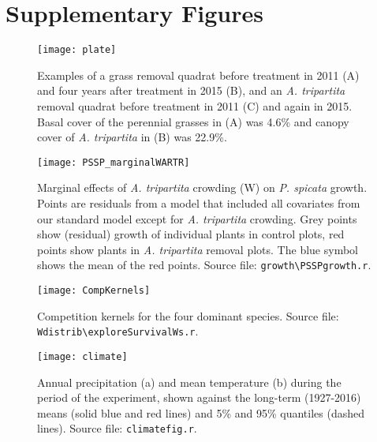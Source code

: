 \documentclass[11pt]{article}
\begin{document}
\section{Supplementary Figures} 

 \begin{figure}[h]
 \centering
 \texttt{[image: plate]}
 \caption{Examples of a grass removal quadrat before treatment in 2011 (A) and four years after treatment in 2015 (B), and an \textit{A. tripartita} removal quadrat before treatment in 2011 (C) and again in 2015. Basal cover of the perennial grasses in (A) was 4.6\% and canopy cover of  \textit{A. tripartita} in (B) was 22.9\%. }
 \label{fig:photos}
 \end{figure}


 \begin{figure}[h]
 \centering
 \texttt{[image: PSSP\_marginalWARTR]}
 \caption{Marginal effects of \textit{A. tripartita} crowding (W) on \textit{P. spicata} growth. Points are residuals from a model that included all 
 covariates from our standard model except for \textit{A. tripartita} crowding. Grey points show (residual) growth of individual plants in control plots, red points show plants in \textit{A. tripartita} removal plots. The blue symbol shows the mean of the red points. Source file: \texttt{growth\textbackslash PSSPgrowth.r}. }
 \label{fig:PSSPresids}
 \end{figure}

 \begin{figure}[h]
 \centering
 \texttt{[image: CompKernels]}
 \caption{Competition kernels for the four dominant species. Source file: \texttt{Wdistrib\textbackslash exploreSurvivalWs.r}. }
 \label{fig:CompKernels}
 \end{figure}
 
  \begin{figure}[h]
  \centering
  \texttt{[image: climate]}
  \caption{Annual precipitation (a) and mean temperature (b) during the period of the experiment, shown against the long-term (1927-2016) means (solid blue and red lines) and 5\% and 95\% quantiles (dashed lines). Source file:  \texttt{climate\textunderscore fig.r}.}
  \label{fig:climate}
  \end{figure}
  
    
\end{document}
